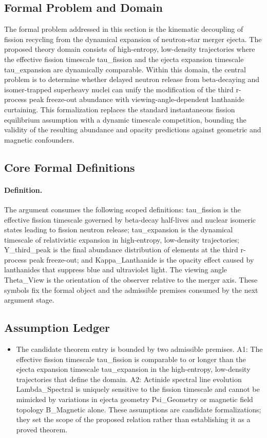 \documentclass[conference]{IEEEtran}
\begin{document}
\subsection{Formal Problem and Domain}
The formal problem addressed in this section is the kinematic decoupling of fission recycling from the dynamical expansion of neutron-star merger ejecta. The proposed theory domain consists of high-entropy, low-density trajectories where the effective fission timescale tau\_fission and the ejecta expansion timescale tau\_expansion are dynamically comparable. Within this domain, the central problem is to determine whether delayed neutron release from beta-decaying and isomer-trapped superheavy nuclei can unify the modification of the third r-process peak freeze-out abundance with viewing-angle-dependent lanthanide curtaining. This formalization replaces the standard instantaneous fission equilibrium assumption with a dynamic timescale competition, bounding the validity of the resulting abundance and opacity predictions against geometric and magnetic confounders.~\cite{cite_2bf3a687e25803e4,cite_30c88fe46f23448d,cite_8beeacaea00bd823}

\subsection{Core Formal Definitions}
\paragraph{Definition.} The argument consumes the following scoped definitions: tau\_fission is the effective fission timescale governed by beta-decay half-lives and nuclear isomeric states leading to fission neutron release; tau\_expansion is the dynamical timescale of relativistic expansion in high-entropy, low-density trajectories; Y\_third\_peak is the final abundance distribution of elements at the third r-process peak freeze-out; and Kappa\_Lanthanide is the opacity effect caused by lanthanides that suppress blue and ultraviolet light. The viewing angle Theta\_View is the orientation of the observer relative to the merger axis. These symbols fix the formal object and the admissible premises consumed by the next argument stage.

\subsection{Assumption Ledger}
\begin{itemize}
\item The candidate theorem entry is bounded by two admissible premises. A1: The effective fission timescale tau\_fission is comparable to or longer than the ejecta expansion timescale tau\_expansion in the high-entropy, low-density trajectories that define the domain. A2: Actinide spectral line evolution Lambda\_Spectral is uniquely sensitive to the fission timescale and cannot be mimicked by variations in ejecta geometry Psi\_Geometry or magnetic field topology B\_Magnetic alone. These assumptions are candidate formalizations; they set the scope of the proposed relation rather than establishing it as a proved theorem.
\end{itemize}
\end{document}
